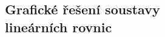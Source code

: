 \documentclass[preview]{standalone}
\begin{document}
\begin{center}
\centering \section{Grafické řešení soustavy\\ lineárních rovnic}
\end{center}
\end{document}

